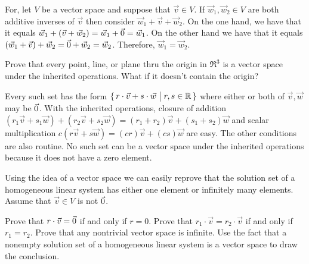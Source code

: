 \begin{exercises}
\begin{answer}
      For, let \( V \) be a vector space and suppose that \( \vec{v}\in V \).
      If \( \vec{w}_1,\vec{w}_2\in V \) are both additive inverses of
      \( \vec{v} \) then consider \( \vec{w}_1+\vec{v}+\vec{w}_2 \).
      On the one hand, we have that it equals $\vec{w}_1+(\vec{v}+\vec{w}_2)=
      \vec{w}_1+\vec{0}=\vec{w}_1$.
      On the other hand we have that it equals $(\vec{w}_1+\vec{v})+\vec{w}_2=
      \vec{0}+\vec{w}_2=\vec{w}_2$.
      Therefore, $\vec{w}_1=\vec{w}_2$.
    \end{answer}
  \item 
    \begin{exparts}
      \partsitem Prove that every point, line, or plane thru the origin in 
         \( \Re^3 \) is a vector space under the inherited operations.
      \partsitem What if it doesn't contain the origin?
    \end{exparts}
    \begin{answer}
     \begin{exparts}
      \partsitem Every such set has the form
        \( \mbox{$\{\,r\cdot\vec{v}+s\cdot\vec{w}\bigm| r,s\in\mathbb{R}\,\}$} \)
        where either or both of \( \vec{v},\vec{w} \) may be \( \vec{0} \).
        With the inherited operations, closure of addition
        \( (r_1\vec{v}+s_1\vec{w})+(r_2\vec{v}+s_2\vec{w})
           =(r_1+r_2)\vec{v}+(s_1+s_2)\vec{w} \)
        and scalar multiplication
        \( c(r\vec{v}+s\vec{w})=(cr)\vec{v}+(cs)\vec{w} \)
        are easy.
        The other conditions are also routine.
      \partsitem No such set can be a vector space under the inherited
        operations because it does not have a zero element.
     \end{exparts}  
    \end{answer}
  \recommended \item 
    Using the idea of a vector space we can easily reprove that
    the solution set of a homogeneous linear system has either 
    one element or infinitely many elements. 
    Assume that \( \vec{v}\in V \) is not \( \vec{0} \).
    \begin{exparts}
      \partsitem Prove that \( r\cdot\vec{v}=\vec{0} \) if and only if \( r=0 \).
      \partsitem Prove that \( r_1\cdot\vec{v}=r_2\cdot\vec{v} \) if
      and only if \( r_1=r_2 \).
      \partsitem Prove that any nontrivial vector space is infinite.
      \partsitem Use the fact that a nonempty solution set of a homogeneous
        linear system is a vector space to draw the conclusion.
    \end{exparts}
    \begin{answer}

\end{answer}
\end{exercises}

